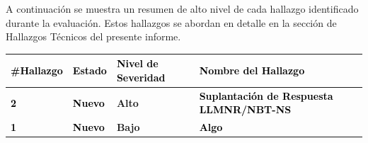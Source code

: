 A continuación se muestra un resumen de alto nivel de cada hallazgo identificado durante la evaluación. Estos hallazgos se abordan en detalle en la sección de Hallazgos Técnicos del presente informe. 

\begin{table}[h!]
    \centering
    \begin{tabularx}{\textwidth}{|X|X|X|X|}
        \hline
        \rowcolor{TableHeaderBgRowColor}        
        \textcolor{black}{\textbf{\#Hallazgo}} &
        \textcolor{black}{\textbf{Estado}} &
        \textcolor{black}{\textbf{Nivel de Severidad}} &
        \textcolor{black}{\textbf{Nombre del Hallazgo}} \\
        \hline
        \rowcolor{TableBgRowColor}        
        \textcolor{black}{\textbf{2}} &
        \textcolor{black}{\textbf{Nuevo}} &
        \textcolor{HighVulnColor}{\textbf{Alto}} &
        \textcolor{black}{\textbf{Suplantación de Respuesta LLMNR/NBT-NS}} \\
        \hline
        \rowcolor{TableBgRowIntemediaColor}        
        \textcolor{black}{\textbf{1}} &
        \textcolor{black}{\textbf{Nuevo}} &
        \textcolor{LowVulnColor}{\textbf{Bajo}} &
        \textcolor{black}{\textbf{Algo}} \\
        \hline
    \end{tabularx}
    \label{tabla:ancho-completo}
\end{table}
